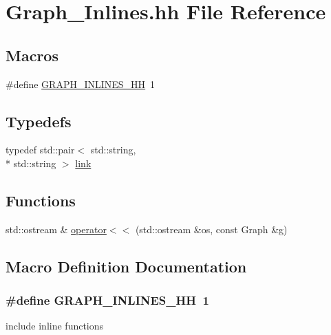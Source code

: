 \hypertarget{Graph__Inlines_8hh}{\section{Graph\-\_\-\-Inlines.\-hh File Reference}
\label{Graph__Inlines_8hh}
}
\subsection*{Macros}
\begin{DoxyCompactItemize}
\item 
\#define \hyperlink{Graph_8hh_ad2e64e62b21ff002127b402dcf1fef17}{G\-R\-A\-P\-H\-\_\-\-I\-N\-L\-I\-N\-E\-S\-\_\-\-H\-H}~1
\end{DoxyCompactItemize}
\subsection*{Typedefs}
\begin{DoxyCompactItemize}
\item 
typedef std\-::pair$<$ std\-::string, \\*
std\-::string $>$ \hyperlink{Graph__Inlines_8hh_a959ca3604ba83e0eafa49fad2cf7b458}{link}
\end{DoxyCompactItemize}
\subsection*{Functions}
\begin{DoxyCompactItemize}
\item 
std\-::ostream \& \hyperlink{Graph__Inlines_8hh_a63ded41af685d3ec7ab3e6dcac27d7d2}{operator$<$$<$} (std\-::ostream \&os, const Graph \&g)
\end{DoxyCompactItemize}


\subsection{Macro Definition Documentation}
\hypertarget{Graph_8hh_ad2e64e62b21ff002127b402dcf1fef17}{
\subsubsection[{G\-R\-A\-P\-H\-\_\-\-I\-N\-L\-I\-N\-E\-S\-\_\-\-H\-H}]{\setlength{\rightskip}{0pt plus 5cm}\#define G\-R\-A\-P\-H\-\_\-\-I\-N\-L\-I\-N\-E\-S\-\_\-\-H\-H~1}}\label{Graph_8hh_ad2e64e62b21ff002127b402dcf1fef17}
include inline functions 

